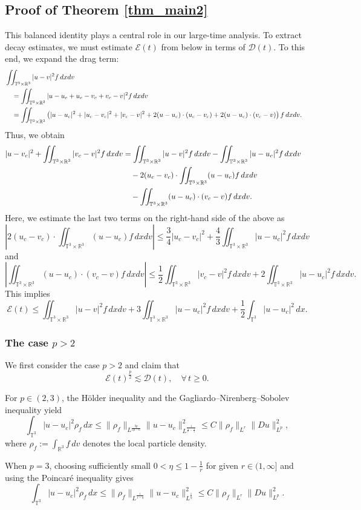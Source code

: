\documentclass[10pt,reqno]{amsart}
\numberwithin{equation}{section}
\newcommand{\R}{\mathbb R}
\newcommand{\ls}{\lesssim}
\newcommand{\T}{\mathbb T}
\newcommand{\bq}{\begin{equation}}
\newcommand{\eq}{\end{equation}}
\newcommand{\lt}{\left}
\newcommand{\rt}{\right}
\newcommand{\calE}{\mathcal{E}}
\newcommand{\calD}{\mathcal{D}}
\newcommand{\intt}{\int_{\T^3}}
\newcommand{\intr}{\int_{\R^3}}
\newcommand{\inttr}{\iint_{\T^3 \times \R^3}}
\begin{document}
%
%
%
%
\subsection{Proof of Theorem \ref{thm_main2}} 
This balanced identity plays a central role in our large-time analysis. To extract decay estimates, we must estimate $\calE(t)$ from below in terms of $\calD(t)$. To this end, we expand the drag term:
\begin{align*}
&\inttr | u - v|^2 f\,dxdv \cr
&\quad = \inttr | u - u_c + u_c - v_c + v_c - v|^2 f\,dxdv\cr
&\quad = \inttr \lt( |u - u_c|^2 + | u_c - v_c|^2 + |v_c - v|^2 + 2(u - u_c) \cdot (u_c - v_c) + 2(u - u_c) \cdot (v_c - v) \rt)f\,dxdv.
\end{align*}
Thus, we obtain
\begin{align*}
|u - v_c|^2 + \inttr |v_c - v|^2 f\,dxdv &= \inttr |u-v|^2 f\,dxdv - \inttr |u - u_c|^2 f\,dxdv\cr
&\quad - 2(u_c - v_c) \cdot \inttr (u - u_c)f\,dxdv\cr
&\quad - \inttr (u - u_c)\cdot (v_c - v)f\,dxdv.
\end{align*}
Here, we estimate the last two terms on the right-hand side of the above as
\[
\lt|2(u_c - v_c) \cdot \inttr (u - u_c)f\,dxdv \rt| \leq \frac34 |u_c - v_c|^2 + \frac43 \inttr |u - u_c|^2 f\,dxdv
\]
and
\[
\lt|\inttr (u - u_c)\cdot (v_c - v)f\,dxdv \rt| \leq \frac12 \inttr |v_c - v|^2 f\,dxdv + 2\inttr |u-u_c|^2 f\,dxdv.
\]
This implies
\bq\label{ineq_E}
\calE(t) \leq \inttr |u-v|^2 f\,dxdv + 3\inttr |u-u_c|^2 f\,dxdv + \frac12 \intt |u - u_c|^2\,dx.
\eq
\subsubsection{The case $p > 2$} 
We first consider the case $p > 2$ and claim that
\[
\calE(t)^{\frac p2} \ls \calD(t), \quad \forall\, t \geq 0.
\]

For $p \in (2,3)$, the H\"older inequality and the Gagliardo--Nirenberg--Sobolev inequality yield
\[
\intt |u - u_c|^2 \rho_f\,dx \leq \|\rho_f\|_{L^{\frac{3p}{5p-6}}} \|u - u_c\|_{L^{\frac{1}{\frac1p - \frac13 }}}^2 \leq C\|\rho_f\|_{L^r}\|Du\|_{L^p}^2,
\]
where $\rho_f := \intr f\,dv$ denotes the local particle density.

When $p=3$, choosing sufficiently small $0 < \eta \leq 1 - \frac1r$ for given $r \in (1,\infty]$ and using the Poincar\'e inequality gives
\[
\intt |u - u_c|^2 \rho_f\,dx \leq \|\rho_f\|_{L^{\frac{1}{1-\eta}}} \|u - u_c\|_{L^{\frac1\eta}}^2 \leq C\|\rho_f\|_{L^r}\|Du\|_{L^p}^2.
\]
\end{document}
